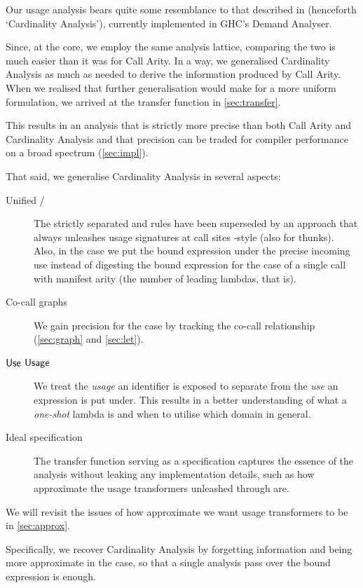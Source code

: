 Our usage analysis bears quite some resemblance to that described in \textcite{card} (henceforth `Cardinality Analysis'), currently implemented in GHC's Demand Analyser.

Since, at the core, we employ the same analysis lattice, comparing the two is much easier than it was for Call Arity.
In a way, we generalised Cardinality Analysis as much as needed to derive the information produced by Call Arity.
When we realised that further generalisation would make for a more uniform formulation, we arrived at the transfer function in \cref{sec:transfer}.

This results in an analysis that is strictly more precise than both Call Arity and Cardinality Analysis and that precision can be traded for compiler performance on a broad spectrum (\cf \cref{sec:impl}).

That said, we generalise Cardinality Analysis in several aspects:

\begin{description}
  \item[Unified /] The strictly separated  and  rules have been superseded by an approach that always unleashes usage signatures at call sites -style (also for thunks). Also, in the  case we put the bound expression under the precise incoming use instead of digesting the bound expression for the case of a single call with manifest arity (the number of leading lambdas, that is).
  \item[Co-call graphs] We gain precision for the  case by tracking the co-call relationship (\cf \cref{sec:graph} and \cref{sec:let}).
  \item[$\text{\textsf{Use}}$ \vs $\text{\textsf{Usage}}$] We treat the \emph{usage} an identifier is exposed to separate from the \emph{use} an expression is put under. This results in a better understanding of what a \emph{one-shot} lambda is and when to utilise which domain in general.
  \item[Ideal specification] The transfer function serving as a specification captures the essence of the analysis without leaking any implementation details, such as how approximate the usage transformers unleashed through  are.
\end{description}

We will revisit the issues of how approximate we want usage transformers to be in \cref{sec:approx}.

Specifically, we recover Cardinality Analysis by forgetting information and being more approximate in the  case, so that a single analysis pass over the bound expression is enough.

